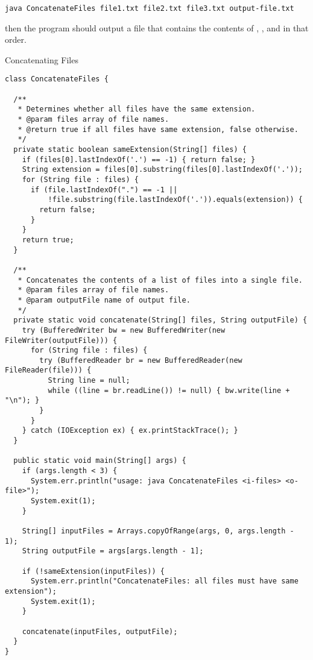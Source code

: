 \par{
\begin{verbatim}
java ConcatenateFiles file1.txt file2.txt file3.txt output-file.txt
\end{verbatim}
}
then the program should output a file  that contains the contents of , , and  in that order. 

\begin{cl}{Concatenating Files}
\begin{lstlisting}[language=MyJava]
class ConcatenateFiles {
 
  /**
   * Determines whether all files have the same extension.
   * @param files array of file names.
   * @return true if all files have same extension, false otherwise.
   */
  private static boolean sameExtension(String[] files) {
    if (files[0].lastIndexOf('.') == -1) { return false; }
    String extension = files[0].substring(files[0].lastIndexOf('.'));
    for (String file : files) {
      if (file.lastIndexOf(".") == -1 || 
          !file.substring(file.lastIndexOf('.')).equals(extension)) { 
        return false; 
      }
    }
    return true;
  }

  /**
   * Concatenates the contents of a list of files into a single file.
   * @param files array of file names.
   * @param outputFile name of output file.
   */
  private static void concatenate(String[] files, String outputFile) {
    try (BufferedWriter bw = new BufferedWriter(new FileWriter(outputFile))) {
      for (String file : files) {
        try (BufferedReader br = new BufferedReader(new FileReader(file))) {
          String line = null;
          while ((line = br.readLine()) != null) { bw.write(line + "\n"); }
        }
      }
    } catch (IOException ex) { ex.printStackTrace(); }
  }

  public static void main(String[] args) {
    if (args.length < 3) {
      System.err.println("usage: java ConcatenateFiles <i-files> <o-file>");
      System.exit(1);
    }

    String[] inputFiles = Arrays.copyOfRange(args, 0, args.length - 1);
    String outputFile = args[args.length - 1];

    if (!sameExtension(inputFiles)) {
      System.err.println("ConcatenateFiles: all files must have same extension");
      System.exit(1);
    }

    concatenate(inputFiles, outputFile);
  }
}
\end{lstlisting}
\end{cl}


